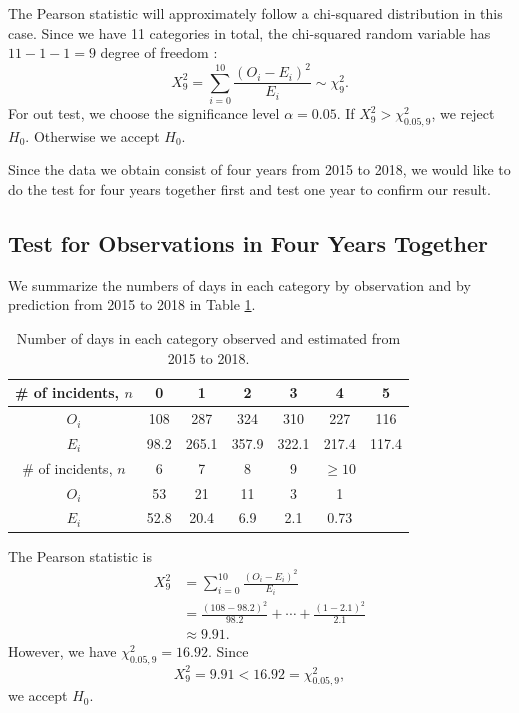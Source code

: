 \documentclass[11pt,a4paper,english]{article}
\begin{document}
The Pearson statistic will approximately follow a chi-squared distribution in this case.
Since we have 11 categories in total, the chi-squared random variable has $11-1-1 = 9$ degree of freedom \cite{slides}:
\begin{equation*}
	X^{2}_{9} = \sum_{i = 0}^{10}
	\frac{(O_{i}-E_{i})^{2}}{E_{i}} \sim \chi_{9}^{2}.
\end{equation*}
For out test, we choose the significance level $\alpha = 0.05$. If $X^{2}_{9} > \chi_{0.05,9}^{2}$, we reject $H_{0}$.
Otherwise we accept $H_{0}$.

Since the data we obtain consist of four years from 2015 to 2018, we would like to do the test for four years together first and test one year to confirm our result. 

\subsection{Test for Observations in Four Years Together}
We summarize the numbers of days in each category by observation and by prediction from 2015 to 2018 in Table \ref{tab:4-years}.
\begin{table}[htbp]
    \centering
	\begin{tabular}{c|cccccc}
		\hline
        \# of incidents, $n$ & 0 & 1 & 2 & 3 & 4 & 5 \\
		\hline
		$O_{i}$ & 108 & 287 & 324 & 310 & 227 & 116\\
		\hline
		$E_{i}$ & 98.2 & 265.1 & 357.9 & 322.1 & 217.4 & 117.4\\ 
		\hline
		\hline
		\# of incidents, $n$ & 6 & 7 & 8 & 9 & $\geq 10$ & \\
		\hline
		$O_{i}$ & 53 & 21 & 11 & 3 & 1 &\\
		\hline
		$E_{i}$  & 52.8 & 20.4 & 6.9 & 2.1 & 0.73 & \\ 
		\hline 
    \end{tabular}
	\caption{Number of days in each category observed and estimated from 2015 to 2018.}
	\label{tab:4-years}
\end{table}
The Pearson statistic is
\begin{align*}
	X_{9}^{2} &= \sum_{i = 0}^{10}\frac{(O_{i}-E_{i})^{2}}{E_{i}}\\
	&= \frac{(108-98.2)^{2}}{98.2}+\cdots+\frac{(1-2.1)^{2}}{2.1}\\
	&\approx 9.91.
\end{align*}
However, we have $\chi^{2}_{0.05,9} = 16.92$.
Since 
\begin{equation*}
	X_{9}^{2} = 9.91 < 16.92 = \chi_{0.05,9}^{2},
\end{equation*}
we accept $H_{0}$.
\end{document}
